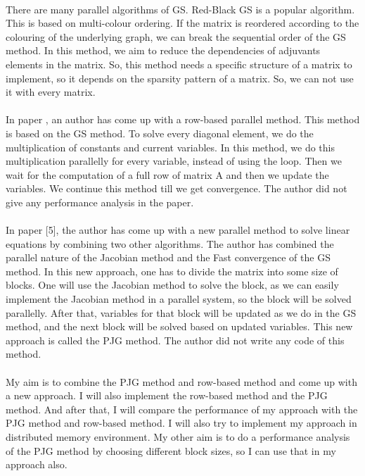 \documentclass[11pt]{article}       %
\begin{document}
\\There are many parallel algorithms of GS. Red-Black GS is a popular algorithm. \cite{rbgs} This is based on multi-colour ordering. If the matrix is reordered according to the colouring of the underlying graph, we can break the sequential order of the GS method. In this method, we aim to reduce the dependencies of adjuvants elements in the matrix. So, this method needs a specific structure of a matrix to implement, so it depends on the sparsity pattern of a matrix. So, we can not use it with every matrix. 
\\
\\In paper \cite{row-based}, an author has come up with a row-based parallel method. This method is based on the GS method. To solve every diagonal element, we do the multiplication of constants and current variables. In this method, we do this multiplication parallelly for every variable, instead of using the loop. Then we wait for the computation of a full row of matrix A and then we update the variables. We continue this method till we get convergence. The author did not give any performance analysis in the paper.
\\
\\In paper [5], the author has come up with a new parallel method to solve linear equations by combining two other algorithms. The author has combined the parallel nature of the Jacobian method and the Fast convergence of the GS method. In this new approach, one has to divide the matrix into some size of blocks. One will use the Jacobian method to solve the block, as we can easily implement the Jacobian method in a parallel system, so the block will be solved parallelly. After that, variables for that block will be updated as we do in the GS method, and the next block will be solved based on updated variables. This new approach is called the PJG method. The author did not write any code of this method.
\\
\\My aim is to combine the PJG method and row-based method and come up with a new approach. I will also implement the row-based method and the PJG method. And after that, I will compare the performance of my approach with the PJG method and row-based method. I will also try to implement my approach in distributed memory environment. My other aim is to do a performance analysis of the PJG method by choosing different block sizes, so I can use that in my approach also. 


\end{document}
